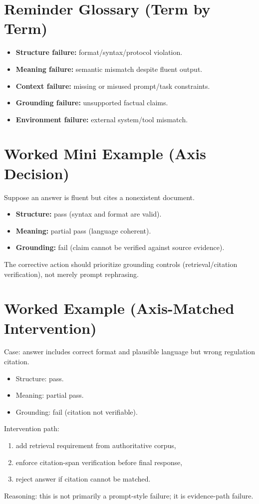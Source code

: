 \section*{Reminder Glossary (Term by Term)}
\begin{itemize}[leftmargin=1.5em]
  \item \textbf{Structure failure:} format/syntax/protocol violation.
  \item \textbf{Meaning failure:} semantic mismatch despite fluent output.
  \item \textbf{Context failure:} missing or misused prompt/task constraints.
  \item \textbf{Grounding failure:} unsupported factual claims.
  \item \textbf{Environment failure:} external system/tool mismatch.
\end{itemize}

\section*{Worked Mini Example (Axis Decision)}
Suppose an answer is fluent but cites a nonexistent document.
\begin{itemize}[leftmargin=1.5em]
  \item \textbf{Structure:} pass (syntax and format are valid).
  \item \textbf{Meaning:} partial pass (language coherent).
  \item \textbf{Grounding:} fail (claim cannot be verified against source evidence).
\end{itemize}
The corrective action should prioritize grounding controls (retrieval/citation verification), not merely prompt rephrasing.

\section*{Worked Example (Axis-Matched Intervention)}
Case: answer includes correct format and plausible language but wrong regulation citation.
\begin{itemize}[leftmargin=1.5em]
  \item Structure: pass.
  \item Meaning: partial pass.
  \item Grounding: fail (citation not verifiable).
\end{itemize}
Intervention path:
\begin{enumerate}[leftmargin=1.5em]
  \item add retrieval requirement from authoritative corpus,
  \item enforce citation-span verification before final response,
  \item reject answer if citation cannot be matched.
\end{enumerate}
Reasoning: this is not primarily a prompt-style failure; it is evidence-path failure.

